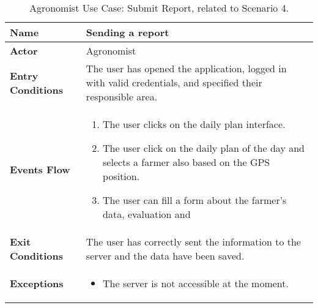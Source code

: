 \begin{table}[hbt!]
\centering
\small
\caption{\label{tab:agrReport}Agronomist Use Case: Submit Report, related to Scenario 4.}

\renewcommand{\arraystretch}{1.25}
\begin{tabular}{|l|>{\raggedright\arraybackslash}m{12cm}|}
    \hline
    \textbf{Name} & Sending a report\\
    \hline
   	\textbf{Actor} & Agronomist\\
    \hline
    \textbf{Entry Conditions} & The user has opened the application, logged in with valid credentials, and specified their responsible area.\\    
    \hline
    \textbf{Events Flow} & 
    	\begin{enumerate}
            \item The user clicks on the daily plan interface.
            \item The user click on the daily plan of the day and selects a farmer also based on the GPS position.
            \item The user can fill a form about the farmer's data, evaluation and 
       \end{enumerate}\\
    \hline
    \textbf{Exit Conditions} & The user has correctly sent the information to the server and the data have been saved.\\
    \hline
    \textbf{Exceptions} & 
    	\begin{itemize}
	    	\item The server is not accessible at the moment.
    	\end{itemize}\\
    \hline 
\end{tabular}
\end{table}
